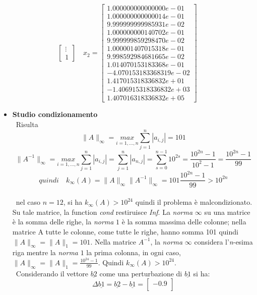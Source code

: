 \begin{itemize}
\[\begin{bmatrix}
  			\vdots  \\
  			1
  		\end{bmatrix} \quad
  		x_2 = \begin{bmatrix}
  		    1.000000000000000e-01 \\
  			1.000000000000014e-01 \\
  			9.999999999985931e-02 \\
  			1.000000000140702e-01 \\
  			9.999999859298470e-02 \\
     		1.000001407015318e-01 \\
     		9.998592984681665e-02 \\
     		1.014070153183368e-01 \\
    		-4.070153183368319e-02 \\
    		1.417015318336832e+01 \\
    		-1.406915318336832e+03 \\
     		1.407016318336832e+05
  		\end{bmatrix}
  		\]
	\begin{itemize}
		\item \textbf{Studio condizionamento}\\\
			Risulta
				\[
					\|A\|_\infty = \underset{i=1,...,n}{max} \sum_{j=1}^n|a_{i,j}|=101
				\]
				\[
					\|A^{-1}\|_\infty = \underset{i=1,...,n}{max} \sum_{j=1}^n|a_{i,j}|=\sum_{j=1}^n|a_{n,j}|=\sum_{s=0}^{n-1}10^{2s}=\frac{10^{2n}-1}{10^2-1}=\frac{10^{2n}-1}{99}
				\]
				\[
					quindi 
					\quad
					k_\infty(A) = \|A\|_\infty \|A^{-1}\|_\infty=101\frac{10^{2n}-1}{99}>10^{2n}
				\]\\\
			nel caso $n=12$, si ha $k_\infty(A)>10^{24}$ quindi il problema è malcondizionato. Su tale matrice, la function \textit{cond} restiruisce \textit{Inf}.
			La \textit{norma} $\infty$ su una matrice è la somma delle righe, la \textit{norma} $1$ è la somma massima delle colonne; nella matrice A tutte le colonne, come tutte le righe, hanno somma 101 quindi $\|A\|_\infty=\|A\|_1=101$. Nella matrice $A^{-1}$, la \textit{norma} $\infty$ considera l'\textit{n}-esima riga mentre la \textit{norma} $1$ la prima colonna, in ogni caso, $\|A\|_\infty=\|A\|_1=\frac{10^{24}-1}{99}$. Quindi $k_\infty(A)>10^{24}$.\\\
			Considerando il vettore $\underline{b2}$ come una perturbazione di $\underline{b1}$ si ha:
			\[
				\Delta\underline{b1}=\underline{b2}-\underline{b1}=\begin{bmatrix}
				-0.9 \\

\end{bmatrix}\]
\end{itemize}
\end{itemize}
